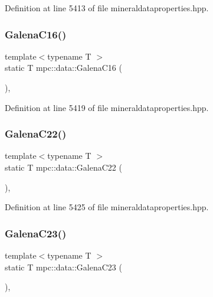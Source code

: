 Definition at line 5413 of file mineraldataproperties.\+hpp.

\mbox{\label{namespacempc_1_1data_a65ccab86ef4e4af308c5c3e6a797c718}} 
\subsubsection{\texorpdfstring{Galena\+C16()}{GalenaC16()}}
{\footnotesize\ttfamily template$<$typename T $>$ \\
static T mpc\+::data\+::\+Galena\+C16 (\begin{DoxyParamCaption}{ }\end{DoxyParamCaption})\hspace{0.3cm}{\ttfamily [inline]}, {\ttfamily [static]}}



Definition at line 5419 of file mineraldataproperties.\+hpp.

\mbox{\label{namespacempc_1_1data_ae502cc704d87cbebd836b748a193bb44}} 
\subsubsection{\texorpdfstring{Galena\+C22()}{GalenaC22()}}
{\footnotesize\ttfamily template$<$typename T $>$ \\
static T mpc\+::data\+::\+Galena\+C22 (\begin{DoxyParamCaption}{ }\end{DoxyParamCaption})\hspace{0.3cm}{\ttfamily [inline]}, {\ttfamily [static]}}



Definition at line 5425 of file mineraldataproperties.\+hpp.

\mbox{\label{namespacempc_1_1data_a4d6d6bcd12108de041ba8d77f9bf7432}} 
\subsubsection{\texorpdfstring{Galena\+C23()}{GalenaC23()}}
{\footnotesize\ttfamily template$<$typename T $>$ \\
static T mpc\+::data\+::\+Galena\+C23 (\begin{DoxyParamCaption}{ }\end{DoxyParamCaption})\hspace{0.3cm}{\ttfamily [inline]}, {\ttfamily [static]}}



